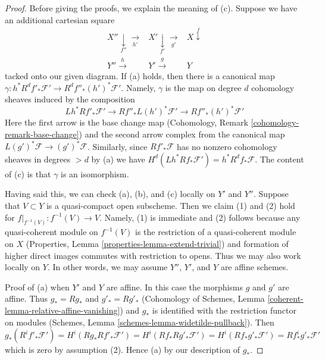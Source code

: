 \begin{proof}
Before giving the proofs, we explain the meaning of (c). Suppose
we have an additional cartesian square
$$
\begin{array}{ccc}X'' \underset{f''}{\downarrow}\underset{h'}{\longrightarrow} & X' \underset{f'}{\downarrow}\underset{g'}{\longrightarrow} & X \overset{f}{\downarrow} \\ Y'' \overset{h}{\longrightarrow} & Y' \overset{g}{\longrightarrow} & Y\end{array}
$$
tacked onto our given diagram. If (a) holds, then there is a canonical
map $\gamma : h^*R^df'_*\mathcal{F}' \to R^df''_*(h')^*\mathcal{F}'$.
Namely, $\gamma$ is the map on degree $d$ cohomology sheaves
induced by the composition
$$
Lh^*Rf'_*\mathcal{F}' \longrightarrow
Rf''_*L(h')^*\mathcal{F}' \longrightarrow Rf''_*(h')^*\mathcal{F}'
$$
Here the first arrow is the base change map
(Cohomology, Remark \ref{cohomology-remark-base-change}) and
the second arrow complex from the canonical map
$L(g')^*\mathcal{F} \to (g')^*\mathcal{F}$.
Similarly, since $Rf'_*\mathcal{F}$ has no nonzero cohomology sheaves in
degrees $> d$ by (a) we have
$H^d(Lh^*Rf_*\mathcal{F}') = h^*R^df_*\mathcal{F}$.
The content of (c) is that $\gamma$ is an isomorphism.

\medskip\noindent
Having said this, we can check (a), (b), and (c) locally on $Y'$ and $Y''$.
Suppose that $V \subset Y$ is a quasi-compact open subscheme. Then we
claim (1) and (2) hold for $f|_{f^{-1}(V)} : f^{-1}(V) \to V$.
Namely, (1) is immediate and (2) follows because any quasi-coherent
module on $f^{-1}(V)$ is the restriction of a quasi-coherent module
on $X$ (Properties, Lemma \ref{properties-lemma-extend-trivial}) and formation
of higher direct images commutes with restriction to opens.
Thus we may also work locally on $Y$. In other words, we may
assume $Y''$, $Y'$, and $Y$ are affine schemes.

\medskip\noindent
Proof of (a) when $Y'$ and $Y$ are affine. In this case the morphisms
$g$ and $g'$ are affine. Thus $g_* = Rg_*$ and $g'_* = Rg'_*$
(Cohomology of Schemes, Lemma \ref{coherent-lemma-relative-affine-vanishing})
and $g_*$ is identified with the restriction functor on modules
(Schemes, Lemma \ref{schemes-lemma-widetilde-pullback}).
Then
$$
g_*(R^if'_*\mathcal{F}') = H^i(Rg_*Rf'_*\mathcal{F}') =
H^i(Rf_*Rg'_*\mathcal{F}') =
H^i(Rf_*g'_*\mathcal{F}') =
Rf^i_*g'_*\mathcal{F}'
$$
which is zero by assumption (2). Hence (a) by our description of $g_*$.


\end{proof}
